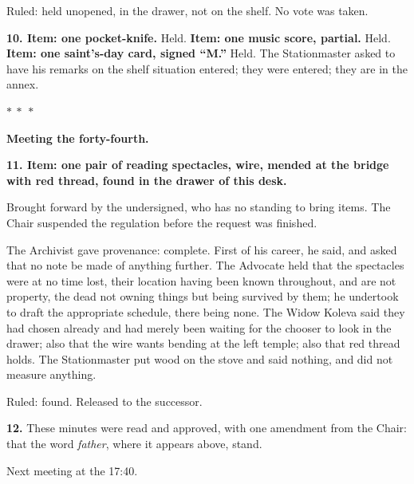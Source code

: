 \documentclass[11pt]{article}
\newcommand{\separator}{\begin{center}\vspace{4pt}$\ast\ \ast\ \ast$\vspace{4pt}\end{center}}
\begin{document}
Ruled: held unopened, in the drawer, not on the shelf. No vote was taken.

\textbf{10. Item: one pocket-knife.} Held. \textbf{Item: one music score, partial.} Held. \textbf{Item: one saint's-day card, signed ``M.''} Held. The Stationmaster asked to have his remarks on the shelf situation entered; they were entered; they are in the annex.

\separator

\textbf{Meeting the forty-fourth.}

\textbf{11. Item: one pair of reading spectacles, wire, mended at the bridge with red thread, found in the drawer of this desk.}

Brought forward by the undersigned, who has no standing to bring items. The Chair suspended the regulation before the request was finished.

The Archivist gave provenance: complete. First of his career, he said, and asked that no note be made of anything further. The Advocate held that the spectacles were at no time lost, their location having been known throughout, and are not property, the dead not owning things but being survived by them; he undertook to draft the appropriate schedule, there being none. The Widow Koleva said they had chosen already and had merely been waiting for the chooser to look in the drawer; also that the wire wants bending at the left temple; also that red thread holds. The Stationmaster put wood on the stove and said nothing, and did not measure anything.

Ruled: found. Released to the successor.

\textbf{12.} These minutes were read and approved, with one amendment from the Chair: that the word \emph{father}, where it appears above, stand.

Next meeting at the 17:40.
\end{document}

